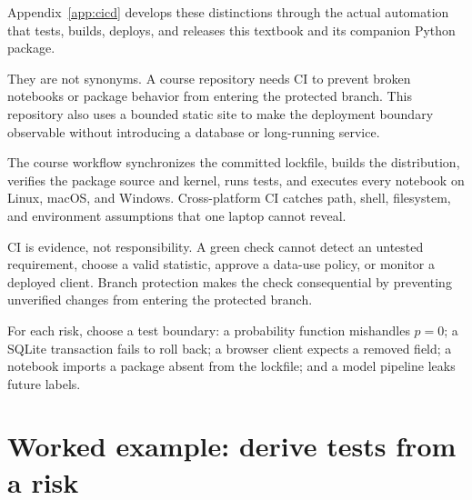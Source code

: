 Appendix~\ref{app:cicd} develops these distinctions through the actual
automation that tests, builds, deploys, and releases this textbook and its
companion Python package.

They are not synonyms. A course repository needs CI to prevent broken notebooks
or package behavior from entering the protected branch. This repository also
uses a bounded static site to make the deployment boundary observable without
introducing a database or long-running service.

\begin{center}
\end{center}

The course workflow synchronizes the committed lockfile, builds the
distribution, verifies the package source and kernel, runs tests, and executes
every notebook on Linux, macOS, and Windows. Cross-platform CI catches path,
shell, filesystem, and environment assumptions that one laptop cannot reveal.

\begin{professionalbox}
CI is evidence, not responsibility. A green check cannot detect an untested
requirement, choose a valid statistic, approve a data-use policy, or monitor a
deployed client. Branch protection makes the check consequential by preventing
unverified changes from entering the protected branch.
\end{professionalbox}

\begin{checkpointbox}
For each risk, choose a test boundary: a probability function mishandles $p=0$;
a SQLite transaction fails to roll back; a browser client expects a removed
field; a notebook imports a package absent from the lockfile; and a model
pipeline leaks future labels.
\end{checkpointbox}

\section{Worked example: derive tests from a risk}

